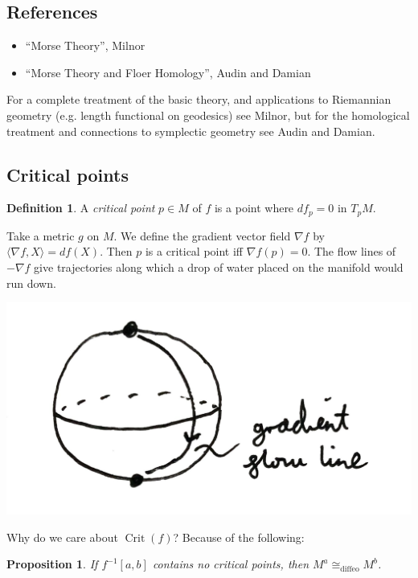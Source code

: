 \documentclass{article}
\newtheorem*{proposition}{Proposition}
\theoremstyle{definition}
\newtheorem*{definition}{Definition}
\DeclareMathOperator{\Crit}{Crit}
\newcommand{\diffeo}{\mathrm{diffeo}}
\begin{document}
\subsection*{References}

\begin{itemize}
    \item ``Morse Theory'', Milnor
    \item ``Morse Theory and Floer Homology'', Audin and Damian
\end{itemize}
For a complete treatment of the basic theory, and applications to Riemannian
geometry (e.g. length functional on geodesics) see Milnor, but for the
homological treatment and connections to symplectic geometry see Audin and
Damian.

\subsection*{Critical points}

\begin{definition}
    A \emph{critical point} $p\in M$ of $f$ is a point where $df_p=0$ in $T_pM$.
\end{definition}

Take a metric $g$ on $M$. We define the gradient vector field $\nabla f$ by
$\langle\nabla f,X\rangle=df(X)$. Then $p$ is a critical point iff
$\nabla f(p)=0$. The flow lines of $-\nabla f$ give trajectories along which a
drop of water placed on the manifold would run down.
\begin{center}
    \includegraphics[scale=0.1]{morse_flow}
\end{center}
Why do we care about $\Crit(f)$? Because of the following:

\begin{proposition}
    If $f^{-1}[a,b]$ contains no critical points, then $M^a\cong_\diffeo M^b$.
\end{proposition}
\end{document}
